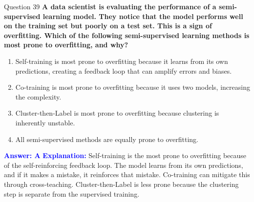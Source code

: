 \documentclass[8pt]{beamer}  %
\begin{document}
	\begin{frame}{Question 39}
		\textbf{A data scientist is evaluating the performance of a semi-supervised learning model. They notice that the model performs well on the training set but poorly on a test set. This is a sign of overfitting. Which of the following semi-supervised learning methods is most prone to overfitting, and why?}
		\begin{enumerate}
			\item Self-training is most prone to overfitting because it learns from its own predictions, creating a feedback loop that can amplify errors and biases.
			\item Co-training is most prone to overfitting because it uses two models, increasing the complexity.
			\item Cluster-then-Label is most prone to overfitting because clustering is inherently unstable.
			\item All semi-supervised methods are equally prone to overfitting.
		\end{enumerate}
		\vspace{0.2cm}
		\textcolor{blue}{\textbf{Answer: A}}
		\vspace{0.2cm}
		\textcolor{blue}{\textbf{Explanation:}} Self-training is the most prone to overfitting because of the self-reinforcing feedback loop. The model learns from its own predictions, and if it makes a mistake, it reinforces that mistake. Co-training can mitigate this through cross-teaching. Cluster-then-Label is less prone because the clustering step is separate from the supervised training.
	\end{frame}
	
\end{document}
